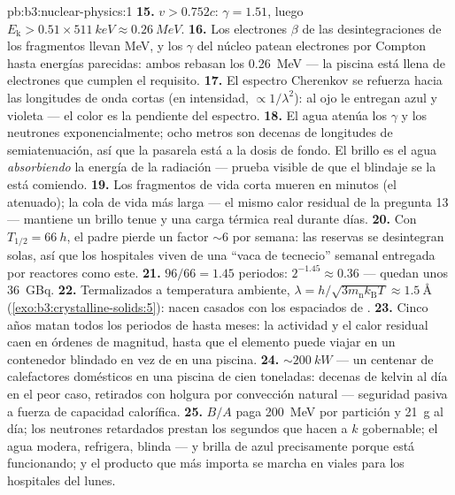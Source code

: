 \begin{solution}{pb:b3:nuclear-physics:1}
\textbf{15.} $v > 0.752c$: $\gamma = 1.51$, luego $E_{\text{k}} >
0.51\times\qty{511}{keV} \approx \qty{0.26}{MeV}$.
\textbf{16.} Los electrones $\beta$ de las desintegraciones de los fragmentos llevan
\unit{MeV}, y los $\gamma$ del núcleo patean electrones por Compton hasta
energías parecidas: ambos rebasan los \qty{0.26}{MeV} --- la piscina
está llena de electrones que cumplen el requisito.
\textbf{17.} El espectro Cherenkov se refuerza hacia las longitudes de onda
cortas (en intensidad, $\propto1/\lambda^2$): al ojo le entregan
azul y violeta --- el color es la pendiente del espectro.
\textbf{18.} El agua atenúa los $\gamma$ y los neutrones
exponencialmente; ocho metros son decenas de longitudes de semiatenuación, así que
la pasarela está a la dosis de fondo. El brillo es el agua
\emph{absorbiendo} la energía de la radiación --- prueba visible de que el
blindaje se la está comiendo.
\textbf{19.} Los fragmentos de vida corta mueren en minutos
(el atenuado); la cola de vida más larga --- el mismo calor residual de la
pregunta 13 --- mantiene un brillo tenue y una carga térmica real durante
días.
\textbf{20.} Con $T_{1/2} = \qty{66}{h}$, el padre pierde un
factor ${\sim}6$ por semana: las reservas se desintegran solas,
así que los hospitales viven de una ``vaca de tecnecio'' semanal entregada por
reactores como este.
\textbf{21.} $96/66 = 1.45$ periodos: $2^{-1.45} \approx
0.36$ --- quedan unos \qty{36}{GBq}.
\textbf{22.} Termalizados a temperatura ambiente, $\lambda =
h/\sqrt{3m_{\text{n}}k_{\text{B}}T} \approx \qty{1.5}{\angstrom}$
(\cref{exo:b3:crystalline-solids:5}): nacen casados con los
espaciados de .
\textbf{23.} Cinco años matan todos los periodos de hasta meses:
la actividad y el calor residual caen en órdenes de magnitud, hasta que el
elemento puede viajar en un contenedor blindado en vez de en una piscina.
\textbf{24.} ${\sim}\qty{200}{kW}$ --- un centenar de calefactores
domésticos en una piscina de cien toneladas: decenas de kelvin al día en el
peor caso, retirados con holgura por convección natural --- seguridad
pasiva a fuerza de capacidad calorífica.
\textbf{25.} $B/A$ paga \qty{200}{MeV} por partición y \qty{21}{g}
al día; los neutrones retardados prestan los segundos que hacen a $k$
gobernable; el agua modera, refrigera, blinda --- y brilla
de azul precisamente porque está funcionando; y el producto que
más importa se marcha en viales para los hospitales del lunes.
\end{solution}
